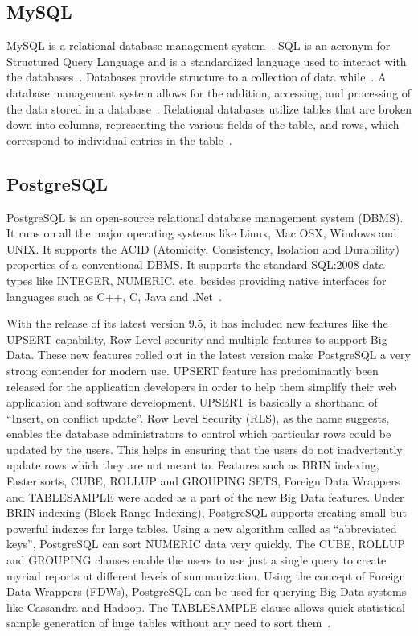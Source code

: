      \pv
     
\subsection{MySQL}

MySQL is a relational database management system~\cite{devmysql}. SQL
is an acronym for Structured Query Language and is a standardized
language used to interact with the databases~\cite{devmysql}.
Databases provide structure to a collection of data
while~\cite{devmysql}. A database management system allows for the
addition, accessing, and processing of the data stored in a
database~\cite{devmysql}. Relational databases utilize tables that are
broken down into columns, representing the various fields of the
table, and rows, which correspond to individual entries in the
table~\cite{howmysql}.

     \pv
     
\subsection{PostgreSQL}

PostgreSQL is an open-source relational database management system
(DBMS).  It runs on all the major operating systems like Linux, Mac
OSX, Windows and UNIX.  It supports the ACID (Atomicity, Consistency,
Isolation and Durability) properties of a conventional DBMS.  It
supports the standard SQL:2008 data types like INTEGER, NUMERIC,
etc. besides providing native interfaces for languages such as C++, C,
Java and .Net~\cite{www-postgreSQL-about}.

With the release of its latest version 9.5, it has included new
features like the UPSERT capability, Row Level security and multiple
features to support Big Data.  These new features rolled out in the
latest version make PostgreSQL a very strong contender for modern use.
UPSERT feature has predominantly been released for the application
developers in order to help them simplify their web application and
software development.  UPSERT is basically a shorthand of ``Insert, on
conflict update''.  Row Level Security (RLS), as the name suggests,
enables the database administrators to control which particular rows
could be updated by the users.  This helps in ensuring that the users
do not inadvertently update rows which they are not meant to.
Features such as BRIN indexing, Faster sorts, CUBE, ROLLUP and
GROUPING SETS, Foreign Data Wrappers and TABLESAMPLE were added as a
part of the new Big Data features.  Under BRIN indexing (Block Range
Indexing), PostgreSQL supports creating small but powerful indexes for
large tables.  Using a new algorithm called as ``abbreviated keys'',
PostgreSQL can sort NUMERIC data very quickly.  The CUBE, ROLLUP and
GROUPING clauses enable the users to use just a single query to create
myriad reports at different levels of summarization.  Using the
concept of Foreign Data Wrappers (FDWs), PostgreSQL can be used for
querying Big Data systems like Cassandra and Hadoop.  The TABLESAMPLE
clause allows quick statistical sample generation of huge tables
without any need to sort them~\cite{www-postgreSQL-features}.

